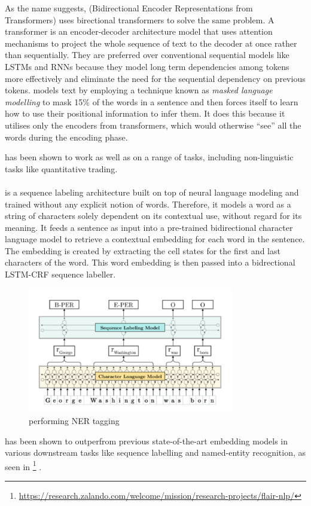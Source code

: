 As the name suggests, \bert (Bidirectional Encoder Representations from Transformers) uses birectional transformers to solve the same problem. A transformer is an encoder-decoder architecture model that uses attention mechanisms to project the whole sequence of text to the decoder at once rather than sequentially. They are preferred over conventional sequential models like LSTMs and RNNs because they model long term dependencies among tokens more effectively and eliminate the need for the sequential dependency on previous tokens. \bert models text by employing a technique known as \textit{masked language modelling} to mask 15\% of the words in a sentence and then forces itself to learn how to use their positional information to infer them. It does this because it utilises only the encoders from transformers, which would otherwise ``see'' all the words during the encoding phase.

\bert has been shown to work as well as \elmo on a range of tasks, including non-linguistic tasks like quantitative trading.

\paragraph{\flair}
\flair \citep{Akbik2018} is a sequence labeling architecture built on top of neural language modeling and trained without any explicit notion of words. Therefore, it models a word as a string of characters solely dependent on its contextual use, without regard for its meaning. It feeds a sentence as input into a pre-trained bidirectional character language model to retrieve a contextual embedding for each word in the sentence. The embedding is created by extracting the cell states for the first and last characters of the word. This word embedding is then passed into a bidrectional LSTM-CRF sequence labeller.

\begin{figure}[h!]
\begin{center}
\includegraphics[width=0.8\textwidth]{Figures/Flair.PNG}
\caption{\flair performing NER tagging}
\label{fig:flair}
\end{center}
\end{figure}
\flair has been shown to outperfrom previous state-of-the-art embedding models in various downstream tasks like sequence labelling and named-entity recognition, as seen in \footnote{\url{https://research.zalando.com/welcome/mission/research-projects/flair-nlp/}} \citep{Akbik2018}.

